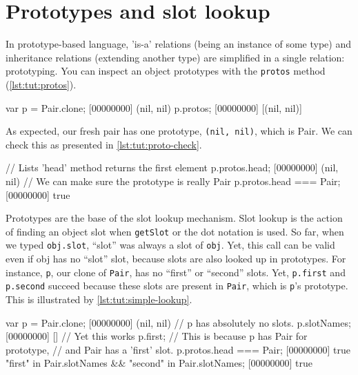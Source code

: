 \section{Prototypes and slot lookup}

In prototype-based language, 'is-a' relations (being an instance of
some type) and inheritance relations (extending another type) are
simplified in a single relation: prototyping. You can inspect an
object prototypes with the \lstinline{protos} method (\autoref{lst:tut:protos}).

\begin{urbiscript}[caption=Inspecting prototypes, label=lst:tut:protos,
  name=protos]
var p = Pair.clone;
[00000000] (nil, nil)
p.protos;
[00000000] [(nil, nil)]
\end{urbiscript}

As expected, our fresh pair has one prototype, \lstinline|(nil, nil)|,
which is Pair. We can check this as presented in \autoref{lst:tut:proto-check}.

\begin{urbiscript}[caption=Checking the prototype,
  label=lst:tut:proto-check, name=protos]
// Lists 'head' method returns the first element
p.protos.head;
[00000000] (nil, nil)
// We can make sure the prototype is really Pair
p.protos.head === Pair;
[00000000] true
\end{urbiscript}

Prototypes are the base of the slot lookup mechanism. Slot lookup is
the action of finding an object slot when \lstinline{getSlot} or the dot
notation is used. So far, when we typed \lstinline|obj.slot|, ``slot''
was always a slot of \lstinline|obj|.
Yet, this call can be valid even if obj has
no ``slot'' slot, because slots are also looked up in prototypes. For
instance, \lstinline|p|, our clone of \lstinline|Pair|, has no
``first'' or ``second'' slots. Yet, \lstinline|p.first| and
\lstinline|p.second| succeed because these slots are present in
\lstinline|Pair|, which is \lstinline|p|'s prototype. This is
illustrated by \autoref{lst:tut:simple-lookup}.

\begin{urbiscript}[caption=Slot found by lookup, label=lst:tut:simple-lookup]
var p = Pair.clone;
[00000000] (nil, nil)
// p has absolutely no slots.
p.slotNames;
[00000000] []
// Yet this works
p.first;
// This is because p has Pair for prototype,
// and Pair has a 'first' slot.
p.protos.head === Pair;
[00000000] true
"first" in Pair.slotNames && "second" in Pair.slotNames;
[00000000] true
\end{urbiscript}

